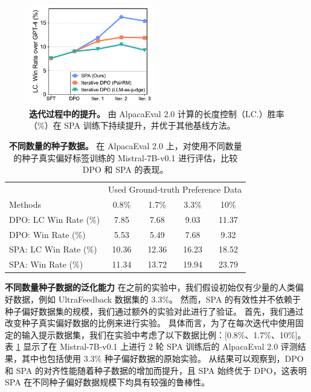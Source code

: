 \begin{figure}
    \centering
	{
	\includegraphics[width=55mm]{figure/raw_files/spa_fig3.pdf}
	\vspace{-0.2cm}
    \caption{\textbf{迭代过程中的提升。} 由 AlpacaEval 2.0 计算的长度控制（LC.）胜率（\%）在 SPA 训练下持续提升，并优于其他基线方法。}\label{fig:res_iteration}
	}
\end{figure}

\begin{table}[t]
    \centering
    \caption{\textbf{不同数量的种子数据。} 在 AlpacaEval 2.0 上，对使用不同数量的种子真实偏好标签训练的 Mistral-7B-v0.1 进行评估，比较 DPO 和 SPA 的表现。}\begin{tabular}{l|cccc}
      \toprule
      & \multicolumn{4}{c}{Used Ground-truth Preference Data} \\
      \cmidrule(lr){2-5}
    Methods  & 0.8\% & 1.7\% & 3.3\% & 10\% \\  \midrule
    DPO: LC Win Rate (\%) & 7.85 & 7.68 & 9.03 & 11.37   \\
    DPO: Win Rate (\%) & 5.53 & 5.49 & 7.68  & 9.32 \\\midrule
    SPA: LC Win Rate (\%) & 10.36 & 12.36 & 16.23 & 18.52  \\
    SPA: Win Rate (\%) & 11.34 & 13.72 & 19.94 & 23.79   \\ 
    \bottomrule
    \end{tabular}
    \label{tab:diff_N_seeds}
\end{table}

\textbf{不同数量种子数据的泛化能力} 
在之前的实验中，我们假设初始仅有少量的人类偏好数据，例如 UltraFeedback 数据集的 3.3\%。
然而，SPA 的有效性并不依赖于种子偏好数据集的规模，我们通过额外的实验对此进行了验证。
首先，我们通过改变种子真实偏好数据的比例来进行实验。
具体而言，为了在每次迭代中使用固定的输入提示数据集，我们在实验中考虑了以下数据比例：[0.8\%、1.7\%、10\%]。
表 \ref{tab:diff_N_seeds} 显示了在 Mistral-7B-v0.1 上进行 2 轮 SPA 训练后的 AlpacaEval 2.0 评测结果，其中也包括使用 3.3\% 种子偏好数据的原始实验。
从结果可以观察到，DPO 和 SPA 的对齐性能随着种子数据的增加而提升，且 SPA 始终优于 DPO，这表明 SPA 在不同种子偏好数据规模下均具有较强的鲁棒性。

